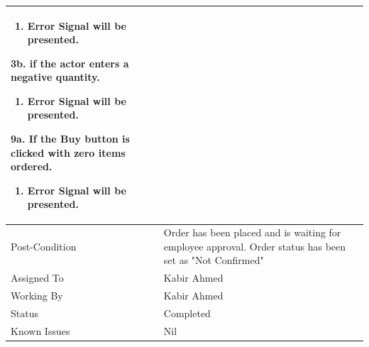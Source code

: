 \documentclass[12pt,a4paper]{article}
\begin{document}
\begin{longtable}{| p{3cm}|p{12cm}|}
\begin{enumerate}
		\item Error Signal will be presented.

	\end{enumerate}

3b. if the actor enters a negative quantity.

 	\begin{enumerate}

		\item Error Signal will be presented.

	\end{enumerate}

9a. If the Buy button is clicked with zero items ordered.

	\begin{enumerate}

		\item Error Signal will be presented.

	\end{enumerate}



\\ \hline

Post-Condition &  Order has been placed and is waiting for employee approval. Order status has been set as "Not Confirmed" \\ \hline
Assigned To &  Kabir Ahmed
\\ \hline
Working By &   Kabir Ahmed
\\ \hline
Status & 	Completed	
\\ \hline
Known Issues & Nil
\\\hline
\end{longtable}

\end{document}
